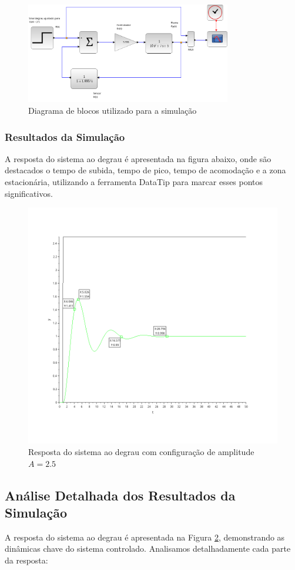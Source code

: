 \begin{figure}[H]
    \centering
    \includegraphics[width=0.8\textwidth]{atividades/5-atividade/assets/diagrama-b.png}
    \caption{Diagrama de blocos utilizado para a simulação}
    \label{fig:diagrama_blocos_b}
\end{figure}
\subsubsection{Resultados da Simulação}
A resposta do sistema ao degrau é apresentada na figura abaixo, onde são destacados o tempo de subida, tempo de pico, tempo de acomodação e a zona estacionária, utilizando a ferramenta DataTip para marcar esses pontos significativos.

\begin{figure}[H]
    \centering
    \includegraphics[height=0.7\textwidth]{atividades/5-atividade/assets/simulation-b.png}
    \caption{Resposta do sistema ao degrau com configuração de amplitude \( A = 2.5 \)}
    \label{fig:simulation_5b}
\end{figure}

\subsection{Análise Detalhada dos Resultados da Simulação}
A resposta do sistema ao degrau é apresentada na Figura \ref{fig:simulation_5b}, demonstrando as dinâmicas chave do sistema controlado. Analisamos detalhadamente cada parte da resposta:

